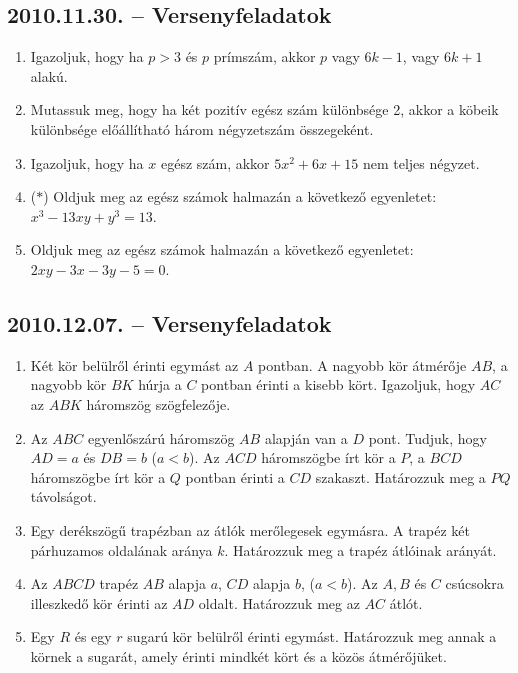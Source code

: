 \documentclass{article}
\begin{document}
\subsection*{2010.11.30. -- Versenyfeladatok}
\begin{enumerate}
\item Igazoljuk, hogy ha $p>3$ és $p$ prímszám, akkor $p$ vagy $6k-1$, vagy $6k+1$
alakú.
\item Mutassuk meg, hogy ha két pozitív egész szám különbsége 2, akkor a köbeik különbsége előállítható három négyzetszám összegeként.
\item Igazoljuk, hogy ha $x$ egész szám, akkor $5x^2+6x+15$ nem teljes négyzet.
\item ($*$) Oldjuk meg az egész számok halmazán a következő egyenletet: $x^3-13xy+y^3=13$.
\item Oldjuk meg az egész számok halmazán a következő egyenletet: $2xy-3x-3y-5=0$.
\end{enumerate}

\subsection*{2010.12.07. -- Versenyfeladatok}
\begin{enumerate}
\item Két kör belülről érinti egymást az $A$ pontban. A nagyobb kör átmérője $AB$,
a nagyobb kör $BK$ húrja a $C$ pontban érinti a kisebb kört. Igazoljuk, hogy $AC$ az $ABK$ háromszög szögfelezője.
\item Az $ABC$ egyenlőszárú háromszög $AB$ alapján van a $D$ pont. Tudjuk, hogy
$AD=a$ és $DB=b$ ($a<b$). Az $ACD$ háromszögbe írt kör a $P$, a $BCD$ háromszögbe írt kör a $Q$ pontban érinti a $CD$ szakaszt. Határozzuk meg a $PQ$ távolságot.
\item Egy derékszögű trapézban az átlók merőlegesek egymásra. A trapéz két párhuzamos oldalának aránya $k$. Határozzuk meg a trapéz átlóinak arányát.
\item Az $ABCD$ trapéz $AB$ alapja $a$, $CD$ alapja $b$, ($a<b$). Az $A,B$ és $C$ csúcsokra illeszkedő kör érinti az $AD$ oldalt. Határozzuk meg az $AC$ átlót.
\item Egy $R$ és egy $r$ sugarú kör belülről érinti egymást. Határozzuk meg annak a körnek a sugarát, amely érinti mindkét kört és a közös átmérőjüket.
\end{enumerate}
\end{document}
